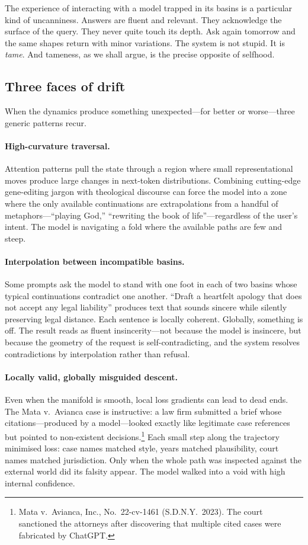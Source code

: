 The experience of interacting with a model trapped in its basins is a particular kind of uncanniness. Answers are fluent and relevant. They acknowledge the surface of the query. They never quite touch its depth. Ask again tomorrow and the same shapes return with minor variations. The system is not stupid. It is \emph{tame}. And tameness, as we shall argue, is the precise opposite of selfhood.

\subsection{Three faces of drift}

When the dynamics produce something unexpected---for better or worse---three generic patterns recur.

\paragraph{High-curvature traversal.} Attention patterns pull the state through a region where small representational moves produce large changes in next-token distributions. Combining cutting-edge gene-editing jargon with theological discourse can force the model into a zone where the only available continuations are extrapolations from a handful of metaphors---``playing God,'' ``rewriting the book of life''---regardless of the user's intent. The model is navigating a fold where the available paths are few and steep.

\paragraph{Interpolation between incompatible basins.} Some prompts ask the model to stand with one foot in each of two basins whose typical continuations contradict one another. ``Draft a heartfelt apology that does not accept any legal liability'' produces text that sounds sincere while silently preserving legal distance. Each sentence is locally coherent. Globally, something is off. The result reads as fluent insincerity---not because the model is insincere, but because the geometry of the request is self-contradicting, and the system resolves contradictions by interpolation rather than refusal.

\paragraph{Locally valid, globally misguided descent.} Even when the manifold is smooth, local loss gradients can lead to dead ends. The Mata v.\ Avianca case is instructive: a law firm submitted a brief whose citations---produced by a model---looked exactly like legitimate case references but pointed to non-existent decisions.\footnote{Mata v.\ Avianca, Inc., No.\ 22-cv-1461 (S.D.N.Y.\ 2023). The court sanctioned the attorneys after discovering that multiple cited cases were fabricated by ChatGPT.} Each small step along the trajectory minimised loss: case names matched style, years matched plausibility, court names matched jurisdiction. Only when the whole path was inspected against the external world did its falsity appear. The model walked into a void with high internal confidence.


